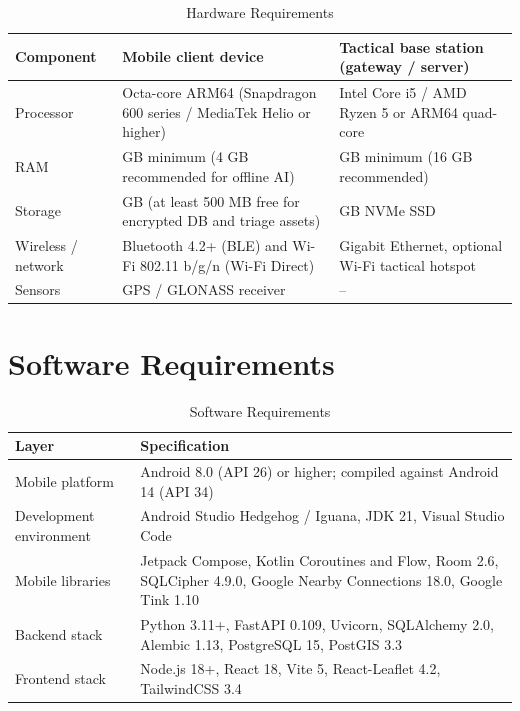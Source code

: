 \documentclass[12pt,a4paper]{report}
\begin{document}
\begin{table}[htbp]
\centering
\small
\caption{Hardware Requirements}
\label{tab:hw}
\renewcommand{\arraystretch}{1.3}
\begin{tabularx}{\textwidth}{|>{\raggedright\arraybackslash}p{2.4cm}|>{\raggedright\arraybackslash}X|>{\raggedright\arraybackslash}X|}
\hline
\textbf{Component} & \textbf{Mobile client device} & \textbf{Tactical base station (gateway / server)} \\
\hline
Processor & Octa-core ARM64 (Snapdragon 600 series / MediaTek Helio or higher) & Intel Core i5 / AMD Ryzen 5 or ARM64 quad-core \\
\hline
RAM & 3 GB minimum (4 GB recommended for offline AI) & 8 GB minimum (16 GB recommended) \\
\hline
Storage & 32 GB (at least 500 MB free for encrypted DB and triage assets) & 256 GB NVMe SSD \\
\hline
Wireless / network & Bluetooth 4.2+ (BLE) and Wi-Fi 802.11 b/g/n (Wi-Fi Direct) & Gigabit Ethernet, optional Wi-Fi tactical hotspot \\
\hline
Sensors & GPS / GLONASS receiver & -- \\
\hline
\end{tabularx}
\end{table}

\section{Software Requirements}

\begin{table}[htbp]
\centering
\small
\caption{Software Requirements}
\label{tab:sw}
\renewcommand{\arraystretch}{1.3}
\begin{tabularx}{\textwidth}{|>{\raggedright\arraybackslash}p{3.6cm}|>{\raggedright\arraybackslash}X|}
\hline
\textbf{Layer} & \textbf{Specification} \\
\hline
Mobile platform & Android 8.0 (API 26) or higher; compiled against Android 14 (API 34) \\
\hline
Development environment & Android Studio Hedgehog / Iguana, JDK 21, Visual Studio Code \\
\hline
Mobile libraries & Jetpack Compose, Kotlin Coroutines and Flow, Room 2.6, SQLCipher 4.9.0, Google Nearby Connections 18.0, Google Tink 1.10 \\
\hline
Backend stack & Python 3.11+, FastAPI 0.109, Uvicorn, SQLAlchemy 2.0, Alembic 1.13, PostgreSQL 15, PostGIS 3.3 \\
\hline
Frontend stack & Node.js 18+, React 18, Vite 5, React-Leaflet 4.2, TailwindCSS 3.4 \\
\hline
\end{tabularx}
\end{table}
\end{document}

